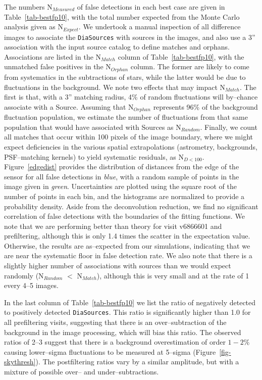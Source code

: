 \documentclass[prd, nofootinbib, floatfix, 11pt,tightenlines,times]{article}
\begin{document}
The numbers N$_{Measured}$ of false detections in each best case are
given in Table~\ref{tab-bestfp10}, with the total number expected from
the Monte Carlo analysis given as N$_{Expect}$.  We undertook a manual
inspection of all difference images to associate the {\tt DiaSources}
with sources in the images, and also use a 3'' association with the
input source catalog to define matches and orphans.  Associations are
listed in the N$_{Match}$ column of Table~\ref{tab-bestfp10}, with the
unmatched false positives in the N$_{Orphan}$ column.  The former are
likely to come from systematics in the subtractions of stars, while
the latter would be due to fluctuations in the background.  We note two
effects that may impact N$_{Match}$.  The first is that, with a 3''
matching radius, 4\% of random fluctuations will by--chance associate
with a Source.  Assuming that N$_{Orphan}$ represents 96\% of the
background fluctuation population, we estimate the number of
fluctuations from that same population that would have associated with
Sources as N$_{Random}$.  Finally, we count all matches that occur
within 100 pixels of the image boundary, where we might expect
deficiencies in the various spatial extrapolations (astrometry,
backgrounds, PSF--matching kernels) to yield systematic residuals, as
N$_{D<100}$.  Figure~\ref{edgedist} provides the distribution of
distances from the edge of the sensor for all false detections in {\it
  blue}, with a random sample of points in the image given in {\it
  green}.  Uncertainties are plotted using the square root of the
number of points in each bin, and the histograms are normalized to
provide a probability density.  Aside from the deconvolution
reduction, we find no significant correlation of false detections with
the boundaries of the fitting functions.  We note that we are
performing better than theory for visit v6866601 and prefiltering,
although this is only 1.4 times the scatter in the expectation value.
Otherwise, the results are as--expected from our simulations,
indicating that we are near the systematic floor in false detection
rate.  We also note that there is a slightly higher number of
associations with sources than we would expect randomly (N$_{Random}$
$<$ N$_{Match}$), although this is very small and at the rate of 1
every 4--5 images.

In the last column of Table~\ref{tab-bestfp10} we list the ratio of
negatively detected to positively detected {\tt DiaSources}.  This
ratio is significantly higher than 1.0 for all prefiltering visits,
suggesting that there is an over--subtraction of the background in the
image processing, which will bias this ratio.  The observed ratios of 2--3 suggest that there
is a background overestimation of order $1-2\%$ causing lower--sigma
fluctuations to be measured at 5--sigma (Figure~\ref{fig-skythresh}).
The postfiltering ratios vary by a similar amplitude, but with a
mixture of possible over-- and under--subtractions.
\end{document}
